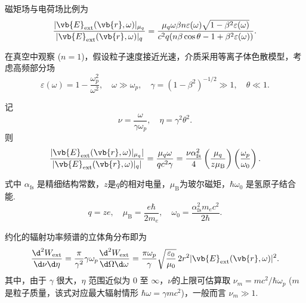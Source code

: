 磁矩场与电荷场比例为
\begin{equation*}
	\frac{|\vb{E}_{\mathrm{ext}}(\vb{r}, \omega)|_{\mu_{q}}}{|\vb{E}_{\mathrm{ext}}(\vb{r}, \omega)|_{q}} = \frac{\mu_{q} \omega \beta n \varepsilon(\omega) \sqrt{1 - \beta^{2} \varepsilon(\omega)}}{c^{2} q (n \beta \cos\theta - 1 + \beta^{2} \varepsilon(\omega))}.
\end{equation*}

在真空中观察 (\(n = 1\))，假设粒子速度接近光速，介质采用等离子体色散模型，考虑高频部分场
\begin{equation*}
	\varepsilon(\omega) = 1 - \frac{\omega_{p}^{2}}{\omega^{2}}, \quad \omega \gg \omega_{p}, \quad
	\gamma = (1 - \beta^{2})^{-1/2} \gg 1, \quad \theta \ll 1.
\end{equation*}

记
\begin{equation*}
	\nu = \frac{\omega}{\gamma \omega_{p}}, \quad \eta = \gamma^{2} \theta^{2}.
\end{equation*}
则
\begin{equation*}
	\frac{|\vb{E}_{\mathrm{ext}}(\vb{r}, \omega)|_{\mu_{q}}|}{|\vb{E}_{\mathrm{ext}}(\vb{r}, \omega)|_{q}|} = \frac{\mu_{q} \omega}{q c^{2} \gamma} = \frac{\nu \alpha_{\mathrm{fs}}^{2}}{4} \left( \frac{\mu_{q}}{z \mu_{\mathrm{B}}} \right) \left( \frac{\omega_{p}}{\omega_{0}} \right).
\end{equation*}

式中 \(\alpha_{\mathrm{fs}}\) 是精细结构常数，\(z\)是\(q\)的相对电量，\(\mu_{\mathrm{B}}\)为玻尔磁矩，\(\hbar\omega_{0}\) 是氢原子结合能.
\begin{equation*}
	q = z e, \quad \mu_{\mathrm{B}} = \frac{e\hbar}{2 m_{e}}, \quad \omega_{0} = \frac{\alpha_{\mathrm{fs}}^{2} m_{e} c^{2}}{2\hbar}.
\end{equation*}

约化的辐射功率频谱的立体角分布即为
\begin{equation*}
	\frac{\d^{2} W_{\mathrm{ext}}}{\d \nu \d \eta} = \frac{\pi}{\gamma^{2}} \gamma \omega_{p} \frac{\d^{2} W_{\mathrm{ext}}}{\d \Omega \d \omega} = \frac{\pi \omega_{p}}{\gamma} \sqrt{\frac{\varepsilon_{0}}{\mu_{0}}} \, 2 r^{2} | \vb{E}_{\mathrm{ext}}(\vb{r}, \omega) |^{2}.
\end{equation*}
其中，由于 \(\gamma\) 很大，\(\eta\) 范围近似为 \(0\) 至 \(\infty\)，\(\nu\)的上限可估算取 \(\nu_{m} =m c^{2}/\hbar \omega_{p}\) (\(m\) 是粒子质量，该式对应最大辐射情形 \(\hbar\omega = \gamma m c^{2}\))，一般而言 \(\nu_{m} \gg 1\).


